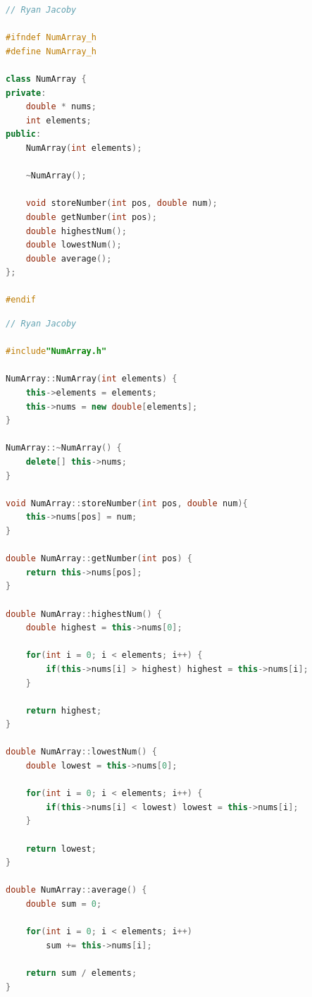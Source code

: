 \documentclass[letterpaper, 11pt]{article}
\begin{document}
\begin{lstlisting}[language=C++, caption=NumArray.h]
// Ryan Jacoby

#ifndef NumArray_h
#define NumArray_h

class NumArray {
private:
    double * nums;
    int elements;
public:
    NumArray(int elements);

    ~NumArray();

    void storeNumber(int pos, double num);
    double getNumber(int pos);
    double highestNum();
    double lowestNum();
    double average();
};

#endif
\end{lstlisting}

\begin{lstlisting}[language=C++, caption=NumArrayImp.cpp]
// Ryan Jacoby

#include"NumArray.h"

NumArray::NumArray(int elements) {
    this->elements = elements;
    this->nums = new double[elements];
}

NumArray::~NumArray() {
    delete[] this->nums;
}

void NumArray::storeNumber(int pos, double num){
    this->nums[pos] = num;
}

double NumArray::getNumber(int pos) {
    return this->nums[pos];
}

double NumArray::highestNum() {
    double highest = this->nums[0];

    for(int i = 0; i < elements; i++) {
        if(this->nums[i] > highest) highest = this->nums[i];
    }

    return highest;
}

double NumArray::lowestNum() {
    double lowest = this->nums[0];
    
    for(int i = 0; i < elements; i++) {
        if(this->nums[i] < lowest) lowest = this->nums[i];
    }

    return lowest;
}

double NumArray::average() {
    double sum = 0;

    for(int i = 0; i < elements; i++) 
        sum += this->nums[i];

    return sum / elements;
}
\end{lstlisting}
\end{document}
